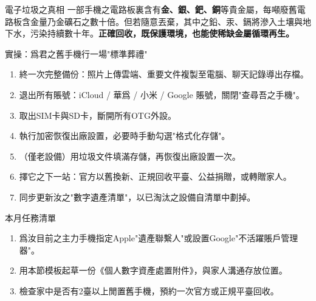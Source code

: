\begin{tcbinfo}{電子垃圾之真相}
一部手機之電路板裏含有\textbf{金、銀、鈀、銅}等貴金屬，每噸廢舊電路板含金量乃金礦石之數十倍。但若隨意丟棄，其中之鉛、汞、鎘將滲入土壤與地下水，污染持續數十年。\textbf{正確回收，既保護環境，也能使稀缺金屬循環再生。}

\end{tcbinfo}

\begin{tcbpractice}{實操：爲君之舊手機行一場"標準葬禮"}
\begin{enumerate}
  \item 終一次完整備份：照片上傳雲端、重要文件複製至電腦、聊天記錄導出存檔。
  \item 退出所有賬號：iCloud / 華爲 / 小米 / Google 賬號，關閉"查尋吾之手機"。
  \item 取出SIM卡與SD卡，斷開所有OTG外設。
  \item 執行加密恢復出廠設置，必要時手動勾選"格式化存儲"。
  \item （僅老設備）用垃圾文件填滿存儲，再恢復出廠設置一次。
  \item 擇它之下一站：官方以舊換新、正規回收平臺、公益捐贈，或轉贈家人。
  \item 同步更新汝之"數字遺產清單"，以已淘汰之設備自清單中劃掉。
\end{enumerate}

\end{tcbpractice}

\begin{tcbpractice}{本月任務清單}
\begin{enumerate}
  \item 爲汝目前之主力手機指定Apple"遺產聯繫人"或設置Google"不活躍賬戶管理器"。
  \item 用本節模板起草一份《個人數字資產處置附件》，與家人溝通存放位置。
  \item 檢查家中是否有2臺以上閒置舊手機，預約一次官方或正規平臺回收。
\end{enumerate}

\end{tcbpractice}

